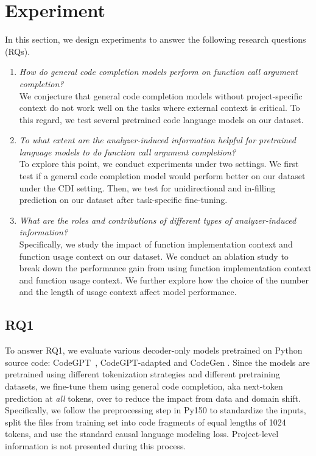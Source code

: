 \section{Experiment}
In this section, we design experiments to answer the following research questions (RQs).
\begin{enumerate}[label=\textbf{RQ\arabic*},leftmargin=0pt,itemindent=2.5em]
  \item \emph{How do general code completion models perform on function call argument completion?} \\
  We conjecture that general code completion models without project-specific context do not work well on the tasks where external context is critical. 
  To this regard, we test several pretrained code language models on our \CallArgs dataset.
  
  \item \emph{To what extent are the analyzer-induced information helpful for pretrained language models to do function call argument completion?} \\
  To explore this point, we conduct experiments under two settings. We first test if a general code completion model would perform better on our \CallArgs dataset under the CDI setting. Then, we test for unidirectional and in-filling prediction on our \CallArgs dataset after task-specific fine-tuning.
  
  \item \emph{What are the roles and contributions of different types of analyzer-induced information?} \\
  Specifically, we study the impact of function implementation context and function usage context on our \CallArgs dataset. We conduct an ablation study to break down the performance gain from using function implementation context and function usage context. We further explore how the choice of the number and the length of usage context affect model performance. 
\end{enumerate}

\subsection{RQ1}
\label{sec:code-completion-experiments}
To answer RQ1, we evaluate various decoder-only models pretrained on Python source code: CodeGPT~\citep{lu2021codexglue}, CodeGPT-adapted \citep{lu2021codexglue} and CodeGen \citep{nijkamp2022conversational}. 
Since the models are pretrained using different tokenization strategies and different pretraining datasets, 
we fine-tune them using general code completion, aka next-token prediction at \emph{all} tokens, over \CallArgs to reduce the impact from data and domain shift.
Specifically, we follow the preprocessing step in Py150 \citep{raychev2016probabilistic} to standardize the inputs, split the files from \CallArgs training set into code fragments of equal lengths of 1024 tokens, and use the standard causal language modeling loss. 
Project-level information is not presented during this process.

